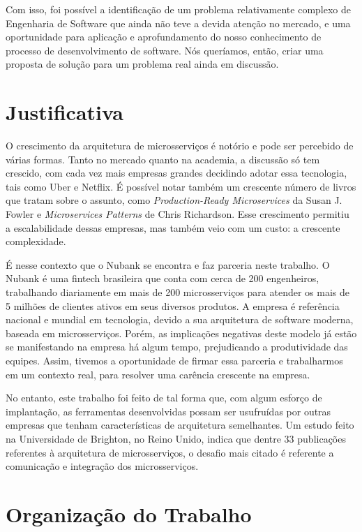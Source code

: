 \documentclass[]{politex}
\begin{document}
	Com isso, foi possível a identificação de um problema relativamente complexo de Engenharia de Software que ainda não teve a devida atenção no mercado, e uma oportunidade para aplicação e aprofundamento do nosso conhecimento de processo de desenvolvimento de software. Nós queríamos, então, criar uma proposta de solução para um problema real ainda em discussão.
	\section{Justificativa}
	O crescimento da arquitetura de microsserviços é notório e pode ser percebido de várias formas. Tanto no mercado quanto na academia, a discussão só tem crescido, com cada vez mais empresas grandes decidindo adotar essa tecnologia, tais como Uber e Netflix. É possível notar também um crescente número de livros que tratam sobre o assunto, como \textit{Production-Ready Microservices} da Susan J. Fowler\cite{productionreadyms} e \textit{Microservices Patterns} de Chris Richardson\cite{mspatterns}. Esse crescimento permitiu a escalabilidade dessas empresas, mas também veio com um custo: a crescente complexidade.
	
	É nesse contexto que o Nubank se encontra e faz parceria neste trabalho. O Nubank é uma fintech brasileira que conta com cerca de 200 engenheiros, trabalhando diariamente em mais de 200 microsserviços para atender os mais de 5 milhões de clientes ativos em seus diversos produtos. A empresa é referência nacional e mundial em tecnologia, devido a sua arquitetura de software moderna, baseada em microsserviços. Porém, as implicações negativas deste modelo já estão se manifestando na empresa há algum tempo, prejudicando a produtividade das equipes. Assim, tivemos a oportunidade de firmar essa parceria e trabalharmos em um contexto real, para resolver uma carência crescente na empresa.
	
	No entanto, este trabalho foi feito de tal forma que, com algum esforço de implantação, as ferramentas desenvolvidas possam ser usufruídas por outras empresas que tenham características de arquitetura semelhantes. Um estudo feito na Universidade de Brighton, no Reino Unido, indica que dentre 33 publicações referentes à arquitetura de microsserviços, o desafio mais citado é referente a comunicação e integração dos microsserviços.\cite{systematicmapping}
	\section{Organização do Trabalho}
	
\end{document}
